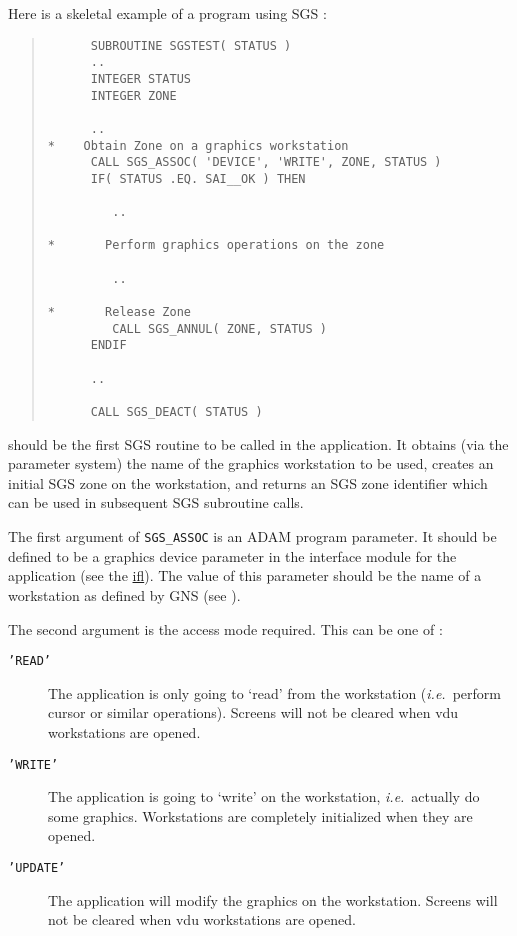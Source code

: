 Here is a skeletal example of a program using SGS :
\begin{quote}
\begin{verbatim}
      SUBROUTINE SGSTEST( STATUS )
      ..
      INTEGER STATUS
      INTEGER ZONE

      ..
*    Obtain Zone on a graphics workstation
      CALL SGS_ASSOC( 'DEVICE', 'WRITE', ZONE, STATUS )
      IF( STATUS .EQ. SAI__OK ) THEN

         ..

*       Perform graphics operations on the zone

         ..

*       Release Zone
         CALL SGS_ANNUL( ZONE, STATUS )
      ENDIF

      ..

      CALL SGS_DEACT( STATUS )

\end{verbatim}
\end{quote}

should be the first SGS routine to be called in the application.
It obtains (via the parameter system) the name of the graphics workstation 
to be used, creates an initial SGS zone on the workstation, and returns an
SGS zone identifier which can be used in subsequent SGS subroutine calls.

The first argument of {\tt SGS\_ASSOC} is an ADAM program parameter. 
It should be
defined to be a graphics device parameter in the interface module for the
application (see the 
\hyperref{example interface file}{example interface file 
in section}{}{ifl}). The value of
this parameter should be the name of a workstation as defined by GNS (see
).

The second argument is the access mode required. This can be one of :
\begin{description}
\item[{\tt 'READ'}] The application is only going to `read' from the workstation
({\em i.e.}\ perform cursor or similar operations). 
Screens will not be cleared when vdu workstations are opened.
\item[{\tt 'WRITE'}] The application is going to `write' on the workstation,
{\em i.e.}\ actually do some graphics. 
Workstations are completely initialized when they are opened.
\item[{\tt 'UPDATE'}] The application will modify the graphics on the 
workstation.
Screens will not be cleared when vdu workstations are opened.
\end{description}

